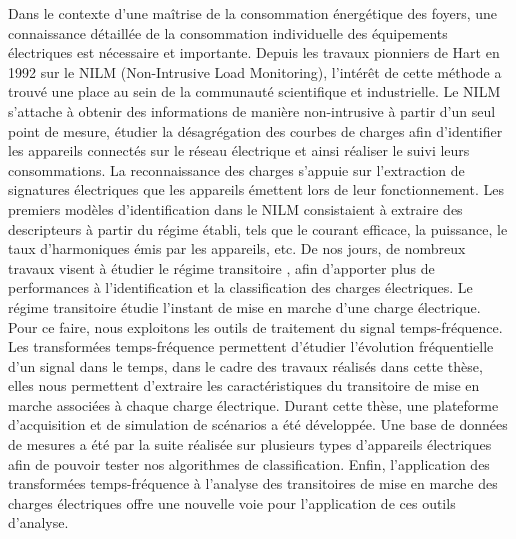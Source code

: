 \documentclass[12pt, a4paper]{article}
\begin{document}
{\normalsize Dans le contexte d'une maîtrise de la consommation énergétique des foyers, une connaissance détaillée de la consommation individuelle des équipements électriques est nécessaire et importante. Depuis les travaux pionniers de Hart en 1992 \cite{hart1992} sur le NILM (Non-Intrusive Load Monitoring), l'intérêt de cette méthode a trouvé une place au sein de la communauté scientifique et industrielle. Le NILM s’attache à obtenir des informations de manière non-intrusive à partir d'un seul point de mesure, étudier la désagrégation des courbes de charges afin d'identifier les appareils connectés sur le réseau électrique et ainsi réaliser le suivi leurs consommations. La reconnaissance des charges s’appuie sur l’extraction de signatures électriques que les appareils émettent lors de leur fonctionnement. Les premiers modèles d’identification dans le NILM consistaient à extraire des descripteurs à partir du régime établi, tels que le courant efficace, la puissance, le taux d’harmoniques émis par les appareils, etc. De nos jours, de nombreux travaux visent à étudier le régime transitoire \cite{naitmeziane2016, sanquer2013}, afin d'apporter plus de performances à l'identification et la classification des charges électriques. Le régime transitoire étudie l'instant de mise en marche d'une charge électrique. Pour ce faire, nous exploitons les outils de traitement du signal temps-fréquence. Les transformées temps-fréquence permettent d'étudier l'évolution fréquentielle d'un signal dans le temps, dans le cadre des travaux réalisés dans cette thèse, elles nous permettent d'extraire les caractéristiques du transitoire de mise en marche associées à chaque charge électrique. Durant cette thèse, une plateforme d'acquisition et de simulation de scénarios a été développée. Une base de données de mesures a été par la suite réalisée sur plusieurs types d'appareils électriques afin de pouvoir tester nos algorithmes de classification. Enfin, l'application des transformées temps-fréquence à l'analyse des transitoires de mise en marche des charges électriques offre une nouvelle voie pour l'application de ces outils d'analyse.

}




\end{document}
